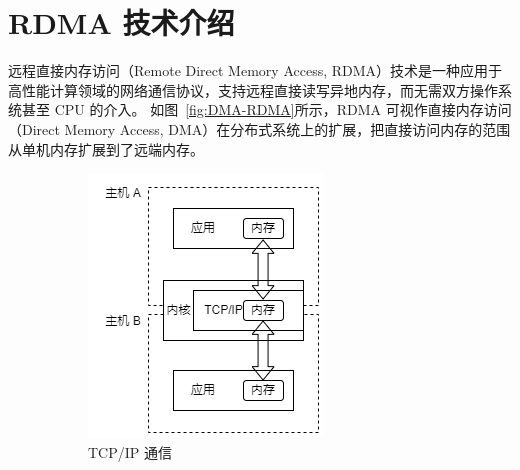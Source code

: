 {    \section{RDMA 技术介绍}
    远程直接内存访问（Remote Direct Memory Access, RDMA）技术是一种应用于高性能计算领域的网络通信协议，支持远程直接读写异地内存，而无需双方操作系统甚至 CPU 的介入。
    如图~\ref{fig:DMA-RDMA}所示，RDMA 可视作直接内存访问（Direct Memory Access, DMA）在分布式系统上的扩展，把直接访问内存的范围从单机内存扩展到了远端内存。
    \begin{figure}[!htbp]
        \centering
        \begin{subfigure}[b]{0.40\textwidth}
            \includegraphics[width=\textwidth]{Img/TCPIP.png}
            \caption{TCP/IP 通信}
            \label{fig:TCPIP}
        \end{subfigure}%
        ~~~~~%
        \begin{subfigure}[b]{0.40\textwidth}

\end{subfigure}
\end{figure}}
